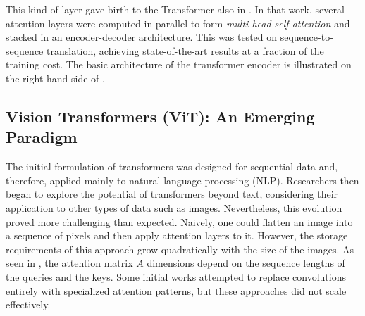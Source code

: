 This kind of layer gave birth to the Transformer also in . In that work, several attention layers were computed in parallel to form \textit{multi-head self-attention} and stacked in an encoder-decoder architecture. This was tested on sequence-to-sequence translation, achieving state-of-the-art results at a fraction of the training cost. The basic architecture of the transformer encoder is illustrated on the right-hand side of .

\subsection{Vision Transformers (ViT): An Emerging Paradigm}\label{subsec:vision_transformer}
The initial formulation of transformers was designed for sequential data and, therefore, applied mainly to natural language processing (NLP). Researchers then began to explore the potential of transformers beyond text, considering their application to other types of data such as images. Nevertheless, this evolution proved more challenging than expected. Naively, one could flatten an image into a sequence of pixels and then apply attention layers to it. However, the storage requirements of this approach grow quadratically with the size of the images. As seen in , the attention matrix $A$ dimensions depend on the sequence lengths of the queries and the keys. Some initial works attempted to replace convolutions entirely with specialized attention patterns, but these approaches did not scale effectively.


